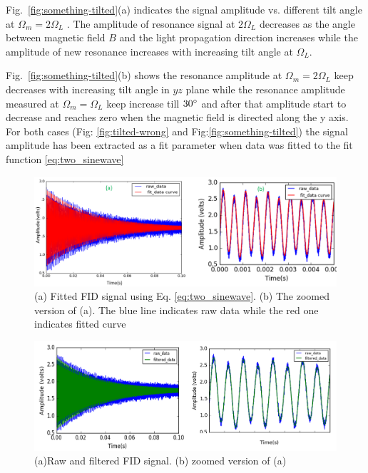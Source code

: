 Fig.~\ref{fig:something-tilted}(a) indicates the signal amplitude vs. different tilt angle at $\Omega_m=2\Omega_L$ . The amplitude of resonance signal at $2\Omega_L$  decreases as the angle between magnetic field $B$ and the light propagation direction increases while the amplitude of new resonance  increases with increasing tilt angle at $\Omega_L$.
      
Fig.~\ref{fig:something-tilted}(b) shows the resonance amplitude at $\Omega_m=2\Omega_L$ keep decreases with increasing tilt angle in $yz$ plane while  the resonance amplitude measured at $\Omega_m=\Omega_L$ keep increase till $30\degree$ and after that amplitude start to decrease and reaches zero when the magnetic field is directed along the y axis. For both cases (Fig: \ref{fig:tilted-wrong} and Fig:\ref{fig:something-tilted}) the signal amplitude has been extracted as a fit parameter when data was fitted to the fit function \ref{eq:two_sinewave}
\begin{figure}[h]
\centering\includegraphics[width=0.9\linewidth]{figures/fitted_data_tilted_field.png}
\caption{(a) Fitted FID signal using Eq. \ref{eq:two_sinewave}. (b)  The zoomed version of (a). The  blue line indicates raw data while the red one indicates fitted curve}
\end{figure}
\begin{figure}[h]
\centering\includegraphics[width=0.9\linewidth]{figures/filtered_data.png}
\caption{(a)Raw and filtered FID signal. (b) zoomed version of (a)}
\end{figure}


